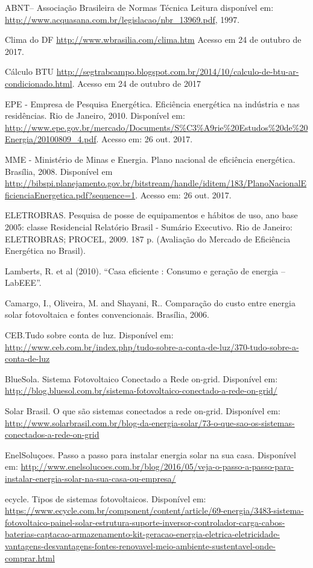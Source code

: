 \par ABNT– Associação Brasileira de Normas Técnica Leitura disponível em: \url{http://www.acquasana.com.br/legislacao/nbr_13969.pdf}, 1997.
\par Clima do DF \url{http://www.wbrasilia.com/clima.htm} Acesso em 24 de outubro de 2017.
\par Cálculo BTU \url{http://segtrabcampo.blogspot.com.br/2014/10/calculo-de-btu-ar-condicionado.html}. Acesso em 24 de outubro de 2017
\par EPE - Empresa de Pesquisa Energética. Eficiência energética na indústria e nas residências. Rio de Janeiro, 2010. Disponível em: \url{http://www.epe.gov.br/mercado/Documents/S%C3%A9rie%20Estudos%20de%20Energia/20100809_4.pdf}. Acesso em: 26 out. 2017.
\par MME - Ministério de Minas e Energia. Plano nacional de eficiência energética. Brasília, 2008. Disponível em \url{http://bibspi.planejamento.gov.br/bitstream/handle/iditem/183/PlanoNacionalEficienciaEnergetica.pdf?sequence=1}. Acesso em: 26 out. 2017.
\par ELETROBRAS. Pesquisa de posse de equipamentos e hábitos de uso, ano base 2005: classe Residencial Relatório Brasil - Sumário Executivo. Rio de Janeiro: ELETROBRAS; PROCEL, 2009. 187 p. (Avaliação do Mercado de Eficiência Energética no Brasil).
\par Lamberts, R. et al (2010). “Casa eficiente : Consumo e geração de energia – LabEEE”.
\par Camargo, I., Oliveira, M. and Shayani, R.. Comparação do custo entre energia solar fotovoltaica e fontes convencionais. Brasília, 2006.
\par CEB.Tudo sobre conta de luz. Disponível em:  \url{http://www.ceb.com.br/index.php/tudo-sobre-a-conta-de-luz/370-tudo-sobre-a-conta-de-luz}
\par BlueSola. Sistema Fotovoltaico Conectado a Rede on-grid. Disponível em: \url{http://blog.bluesol.com.br/sistema-fotovoltaico-conectado-a-rede-on-grid/}
\par Solar Brasil. O que são sistemas conectados a rede on-grid. Disponível em: \url{http://www.solarbrasil.com.br/blog-da-energia-solar/73-o-que-sao-os-sistemas-conectados-a-rede-on-grid}
\par EnelSoluçoes. Passo a passo para instalar energia solar na sua casa. Disponível em: \url{http://www.enelsolucoes.com.br/blog/2016/05/veja-o-passo-a-passo-para-instalar-energia-solar-na-sua-casa-ou-empresa/}
\par ecycle. Tipos de sistemas fotovoltaicos. Disponível em: \url{https://www.ecycle.com.br/component/content/article/69-energia/3483-sistema-fotovoltaico-painel-solar-estrutura-suporte-inversor-controlador-carga-cabos-baterias-captacao-armazenamento-kit-geracao-energia-eletrica-eletricidade-vantagens-desvantagens-fontes-renovavel-meio-ambiente-sustentavel-onde-comprar.html}
